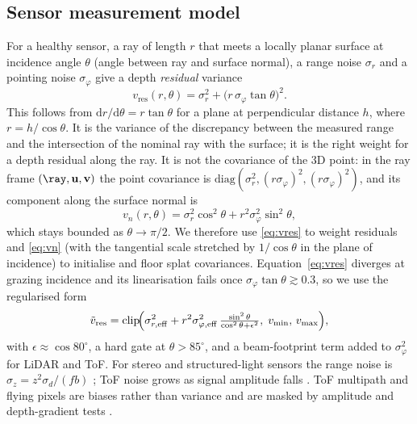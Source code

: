\subsection{Sensor measurement model}
\label{sec:form:sensor}
For a healthy sensor, a ray of length $r$ that meets a locally planar surface at incidence angle
$\theta$ (angle between ray and surface normal), a range noise $\sigma_r$ and a
pointing noise $\sigma_\varphi$ give a depth \emph{residual} variance
\begin{equation}
  v_{\mathrm{res}}(r,\theta)=\sigma_r^{2}+\bigl(r\,\sigma_\varphi\tan\theta\bigr)^{2}.
  \label{eq:vres}
\end{equation}
This follows from $\mathrm{d}r/\mathrm{d}\theta=r\tan\theta$ for a plane at
perpendicular distance $h$, where $r=h/\cos\theta$. It is the variance of the
discrepancy between the measured range and the intersection of the nominal ray
with the surface; it is the right weight for a depth residual along the ray. It is
not the covariance of the 3D point: in the ray frame $(\ray,\mathbf{u},\mathbf{v})$
the point covariance is $\mathrm{diag}(\sigma_r^2,(r\sigma_\varphi)^2,(r\sigma_\varphi)^2)$,
and its component along the surface normal is
\begin{equation}
  v_{n}(r,\theta)=\sigma_r^{2}\cos^{2}\theta+r^{2}\sigma_\varphi^{2}\sin^{2}\theta,
  \label{eq:vn}
\end{equation}
which stays bounded as $\theta\to\pi/2$. We therefore use \eqref{eq:vres} to
weight residuals and \eqref{eq:vn} (with the tangential scale stretched by
$1/\cos\theta$ in the plane of incidence) to initialise and floor splat
covariances. Equation~\eqref{eq:vres} diverges at grazing incidence and its
linearisation fails once $\sigma_\varphi\tan\theta\gtrsim 0.3$, so we use
the regularised form
\begin{equation}
  \tilde v_{\mathrm{res}}=\operatorname{clip}\!\Bigl(\sigma_{r,\mathrm{eff}}^{2}
  +r^{2}\sigma_{\varphi,\mathrm{eff}}^{2}\,\tfrac{\sin^{2}\theta}{\cos^{2}\theta+\epsilon^{2}},\;
  v_{\min},\,v_{\max}\Bigr),
  \label{eq:vreg}
\end{equation}
with $\epsilon\approx\cos 80^{\circ}$, a hard gate at $\theta>85^{\circ}$, and a
beam-footprint term added to $\sigma_\varphi^2$ for LiDAR and ToF. For stereo
and structured-light sensors the range noise is $\sigma_z=z^{2}\sigma_d/(fb)$
\cite{noise_khoshelham,noise_matthies}; ToF noise grows as signal amplitude falls
\cite{noise_lange,noise_sarbolandi}. ToF multipath and flying pixels are biases
rather than variance and are masked by amplitude and depth-gradient tests
\cite{noise_freedman}.

